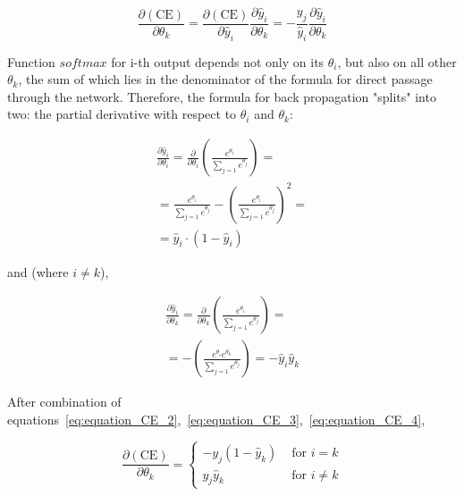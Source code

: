 \begin{equation}
\frac{\partial(\textrm{CE})}{\partial{\theta_{k}}} =  \frac{\partial(\textrm{CE})}{\partial{\hat{y}_{i}}}\frac{\partial{\hat{y}_{i}}}{\partial{\theta_{k}}} 
=-\frac{y_{j}}{\hat{y}_{i}}\frac{\partial{\hat{y}_{i}}}{\partial{\theta_{k}}}
\end{equation}

Function $softmax$ for i-th output depends not only on its $\theta_{i}$, but also on all other $\theta_{k}$, the sum of which lies in the denominator of the formula for direct passage through the network. Therefore, the formula for back propagation "splits" into two: the partial derivative with respect to $\theta_{i}$ and $\theta_{k}$:

\begin{equation}
\begin{multlined}
\label{eq:equation_CE_3}
\frac{\partial{\hat{y}_{i}}}{\partial{\theta_{i}}} =  \frac{\partial}{\partial{\theta_{i}}}\left( \frac{e^{\theta_{i}}}{\sum_{j=1}{e^{\theta_{j}}}}\right) =\\
= \frac{e^{\theta_{i}}}{\sum_{j=1}{e^{\theta_{j}}}} - \left(\frac{e^{\theta_{i}}}{\sum_{j=1}{e^{\theta_{j}}}}\right)^{2} = \\
= \hat{y}_{i}\cdot(1 - \hat{y}_{i})
\end{multlined}
\end{equation}

and (where $i\neq k$),

\begin{equation}
\label{eq:equation_CE_4}
\begin{multlined}
\frac{\partial{\hat{y}_{i}}}{\partial{\theta_{k}}} =  \frac{\partial}{\partial{\theta_{k}}}\left( \frac{e^{\theta_{i}}}{\sum_{j=1}{e^{\theta_{j}}}}\right) = \\
=-\left(\frac{e^{\theta_{i}}e^{\theta_{k}}}{\sum_{j=1}{e^{\theta_{j}}}}\right)
= - \hat{y}_{i}\hat{y}_{k}
\end{multlined}
\end{equation}

After combination of equations~\ref{eq:equation_CE_2},~\ref{eq:equation_CE_3},~\ref{eq:equation_CE_4}, 

\begin{equation}
\label{eq:CE_gradient}
\frac{\partial(\textrm{CE})}{\partial{\theta_{k}}} = \begin{cases}
-y_{j}(1 - \hat{y}_{k})&\text{ for }i=k \\
y_{j}\hat{y}_{k}&\text{ for }i\neq k
\end{cases}
\end{equation}

